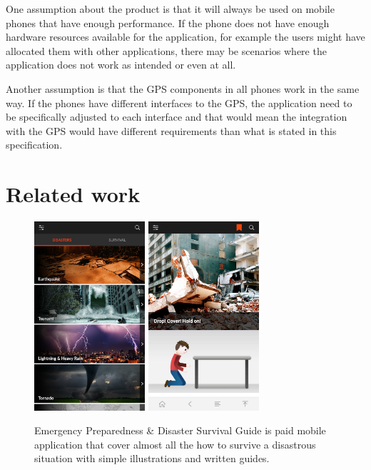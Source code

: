 \documentclass{scrreprt}
\begin{document}
One assumption about the product is that it will always be used on mobile phones that have enough performance. If the phone does not have enough hardware resources available for the application, for
example the users might have allocated them with other applications, there may be scenarios where the application does not work as intended or even at all.

Another assumption is that the GPS components in all phones work in the same way. If the phones have different interfaces to the GPS, the application need to be specifically adjusted to each interface and that would mean the integration with the GPS would have different requirements than what is stated in this specification.

\newpage
\section{Related work}
\begin{figure}[ht!]
    \centering
    \includegraphics[height=7cm]{appImages/EPD1.jpg}
    \qquad
    \includegraphics[height=7cm]{appImages/EPD2.jpg}
    \caption[Emergency Preparedness \& Disaster Survival Guide]{Emergency Preparedness \& Disaster Survival Guide is paid mobile application that cover almost all the how to survive a disastrous situation with simple  illustrations and written guides.}%
    \label{fig:app1}%
\end{figure}
\end{document}
